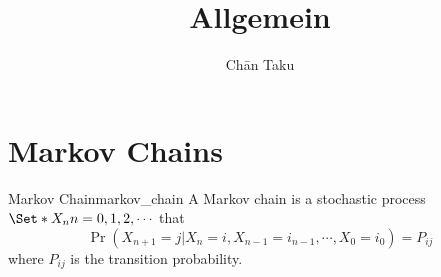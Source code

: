 \documentclass{article}
\title{Allgemein}
\author{Ch\=an Taku}
\begin{document}
\maketitle

\section{Markov Chains}

\begin{definition}{Markov Chain}{markov_chain}
    A Markov chain is a stochastic process $\Set*{X_n}{n=0,1,2,\cdots}$ that
    \[ \operatorname{Pr}(X_{n+1}=j | X_n = i, X_{n-1} = i_{n-1}, \cdots, X_0 = i_0) = P_{ij} \]
    where $P_{ij}$ is the transition probability.
\end{definition}

% 
% 
\end{document}
